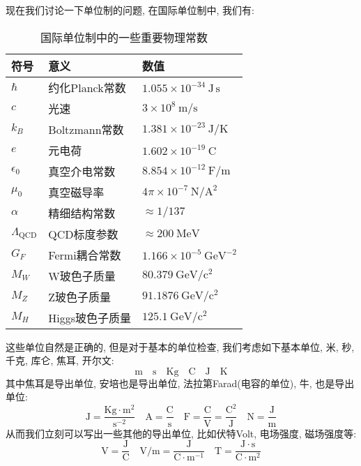 现在我们讨论一下单位制的问题, 在国际单位制中, 我们有:
\begin{table}[h!]
\centering
\begin{tabular}{|l|l|l|}
  \hline
  符号 & 意义 & 数值 \\
  \hline
  $\hbar$ & 约化Planck常数 & $1.055 \times 10^{-34}~\mathrm{J\,s}$ \\
  $c$ & 光速 & $3\times10^8~\mathrm{m/s}$ \\
  $k_B$ & Boltzmann常数 & $1.381 \times 10^{-23}~\mathrm{J/K}$ \\
  $e$ & 元电荷 & $1.602 \times 10^{-19}~\mathrm{C}$ \\
  $\epsilon_0$ & 真空介电常数 & $8.854 \times 10^{-12}~\mathrm{F/m}$ \\
  $\mu_0$ & 真空磁导率 & $4\pi \times 10^{-7}~\mathrm{N/A^2}$\\
  $\alpha$ & 精细结构常数 & $\approx 1/137$\\
  $\Lambda_{\text{QCD}}$ & QCD标度参数 & $\approx 200~\mathrm{MeV}$\\
  $G_F$ & Fermi耦合常数 & $1.166 \times 10^{-5}~\mathrm{GeV}^{-2}$\\
  $M_W$ & W玻色子质量 & $80.379~\mathrm{GeV/c^2}$\\
  $M_Z$ & Z玻色子质量 & $91.1876~\mathrm{GeV/c^2}$\\
  $M_H$ & Higgs玻色子质量 & $125.1~\mathrm{GeV/c^2}$\\
  \hline
\end{tabular}
\caption{国际单位制中的一些重要物理常数}
\label{tab:physical_constants}
\end{table}
这些单位自然是正确的, 但是对于基本的单位检查, 我们考虑如下基本单位, 米, 秒, 千克, 库仑, 焦耳, 开尔文:
\begin{equation}
  \mathrm{m} \quad \mathrm{s} \quad \mathrm{Kg} \quad \mathrm{C} \quad \mathrm{J}  \quad \mathrm{K}
\end{equation}
其中焦耳是导出单位, 安培也是导出单位, 法拉第Farad(电容的单位), 牛, 也是导出单位:
\begin{equation}
  \mathrm{J} = \frac{\mathrm{Kg} \cdot \mathrm{m^2}}{\mathrm{s^{-2}}} \quad \mathrm{A} = \frac{\mathrm{C}}{\mathrm{s}} \quad \mathrm{F} = \frac{\mathrm{C}}{\mathrm{V}} = \frac{\mathrm{C}^2}{\mathrm{J}} \quad \mathrm{N} = \frac{\mathrm{J}}{\mathrm{m}}
\end{equation}
从而我们立刻可以写出一些其他的导出单位, 比如伏特Volt, 电场强度, 磁场强度等:
\begin{equation}
  \mathrm{V} = \frac{\mathrm{J}}{\mathrm{C}} \quad \mathrm{V/m} = \frac{\mathrm{J}}{\mathrm{C} \cdot \mathrm{m^{-1}}} \quad \mathrm{T} = \frac{\mathrm{J} \cdot \mathrm{s}}{\mathrm{C} \cdot \mathrm{m^2}}
\end{equation}
